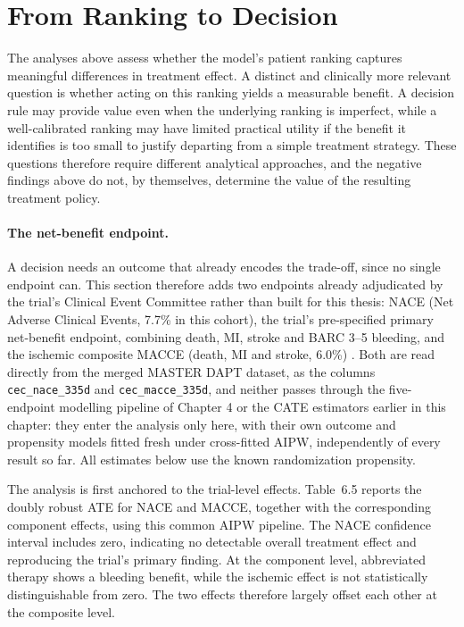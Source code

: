 \section{From Ranking to Decision}
\label{sec:decision}

The analyses above assess whether the model's patient ranking captures
meaningful differences in treatment effect. A distinct and clinically more
relevant question is whether acting on this ranking yields a measurable
benefit. A decision rule may provide value even when the underlying ranking
is imperfect, while a well-calibrated ranking may have limited practical
utility if the benefit it identifies is too small to justify departing from
a simple treatment strategy. These questions therefore require different
analytical approaches, and the negative findings above do not, by
themselves, determine the value of the resulting treatment policy.

\paragraph{The net-benefit endpoint.}
A decision needs an outcome that already encodes the trade-off, since no single
endpoint can. This section therefore adds two endpoints already adjudicated by
the trial's Clinical Event Committee rather than built for this thesis: NACE
(Net Adverse Clinical Events, 7.7\% in this cohort), the trial's pre-specified
primary net-benefit endpoint, combining death, MI, stroke and BARC 3--5
bleeding, and the ischemic composite MACCE (death, MI and stroke, 6.0\%)
\citep{valgimigli2021masterdapt}. Both
are read directly from the merged MASTER DAPT dataset, as the columns
\texttt{cec\_nace\_335d} and \texttt{cec\_macce\_335d}, and neither passes
through the five-endpoint modelling pipeline of Chapter 4 or the CATE
estimators earlier in this chapter: they enter the analysis only here, with
their own outcome and propensity models fitted fresh under cross-fitted AIPW,
independently of every result so far. All estimates below use the known
randomization propensity.

The analysis is first anchored to the trial-level effects. Table~6.5 reports
the doubly robust ATE for NACE and MACCE, together with the corresponding
component effects, using this common AIPW pipeline. The NACE confidence
interval includes zero, indicating no detectable overall treatment effect and
reproducing the trial's primary finding. At the component level, abbreviated
therapy shows a bleeding benefit, while the ischemic effect is not
statistically distinguishable from zero. The two effects therefore largely
offset each other at the composite level.

